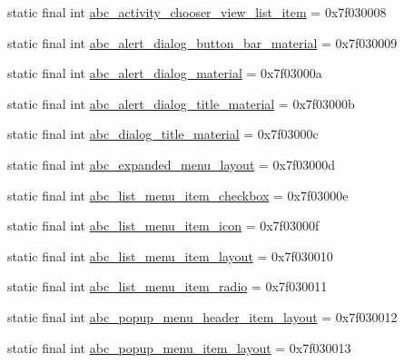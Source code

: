 \begin{CompactItemize}
static final int \hyperlink{classandroid_1_1support_1_1graphics_1_1drawable_1_1_r_1_1layout_0dfb96c7e3c7f801bbbf4b114815d131}{abc\_\-activity\_\-chooser\_\-view\_\-list\_\-item} = 0x7f030008
\item 
static final int \hyperlink{classandroid_1_1support_1_1graphics_1_1drawable_1_1_r_1_1layout_bb50fe640bac90d8f9509c16b360f1bc}{abc\_\-alert\_\-dialog\_\-button\_\-bar\_\-material} = 0x7f030009
\item 
static final int \hyperlink{classandroid_1_1support_1_1graphics_1_1drawable_1_1_r_1_1layout_e677d6dccda70b6461804a0557613b9b}{abc\_\-alert\_\-dialog\_\-material} = 0x7f03000a
\item 
static final int \hyperlink{classandroid_1_1support_1_1graphics_1_1drawable_1_1_r_1_1layout_01c683b100d51a75fc0d51d133f002b2}{abc\_\-alert\_\-dialog\_\-title\_\-material} = 0x7f03000b
\item 
static final int \hyperlink{classandroid_1_1support_1_1graphics_1_1drawable_1_1_r_1_1layout_30d76321ba7a89833579916121a427e9}{abc\_\-dialog\_\-title\_\-material} = 0x7f03000c
\item 
static final int \hyperlink{classandroid_1_1support_1_1graphics_1_1drawable_1_1_r_1_1layout_5c1b4917cc890d81f27e5b3492cd58fe}{abc\_\-expanded\_\-menu\_\-layout} = 0x7f03000d
\item 
static final int \hyperlink{classandroid_1_1support_1_1graphics_1_1drawable_1_1_r_1_1layout_8e0ca614eb159b95ec0a634eb140d2af}{abc\_\-list\_\-menu\_\-item\_\-checkbox} = 0x7f03000e
\item 
static final int \hyperlink{classandroid_1_1support_1_1graphics_1_1drawable_1_1_r_1_1layout_18fcd9c7c74447491f9323984598bbc1}{abc\_\-list\_\-menu\_\-item\_\-icon} = 0x7f03000f
\item 
static final int \hyperlink{classandroid_1_1support_1_1graphics_1_1drawable_1_1_r_1_1layout_d6b2e6acb6e8be29385b4b6d119c9db6}{abc\_\-list\_\-menu\_\-item\_\-layout} = 0x7f030010
\item 
static final int \hyperlink{classandroid_1_1support_1_1graphics_1_1drawable_1_1_r_1_1layout_093720d81232e1bed5d4cbc2bc007e35}{abc\_\-list\_\-menu\_\-item\_\-radio} = 0x7f030011
\item 
static final int \hyperlink{classandroid_1_1support_1_1graphics_1_1drawable_1_1_r_1_1layout_b7e6e7dc006da4370458ef237c70518d}{abc\_\-popup\_\-menu\_\-header\_\-item\_\-layout} = 0x7f030012
\item 
static final int \hyperlink{classandroid_1_1support_1_1graphics_1_1drawable_1_1_r_1_1layout_f576139ea74081c8c08413baee22b56b}{abc\_\-popup\_\-menu\_\-item\_\-layout} = 0x7f030013

\end{CompactItemize}
